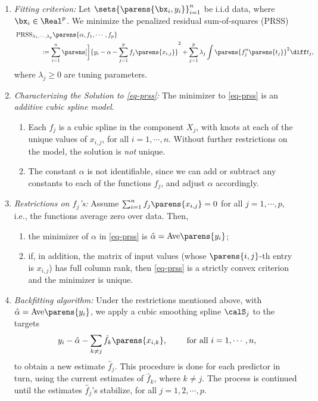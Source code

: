 \documentclass[12pt]{article}
\begin{document}
\begin{enumerate}[label=\textbf{\arabic*.}]
\begin{enumerate}
		\item \textit{Fitting criterion:} Let $\sets{\parens{\bx_i, y_i}}_{i=1}^n$ be i.i.d data, where $\bx_i \in \Real^p$. We minimize the penalized residual sum-of-squares (PRSS)
		\begin{align}\label{eq-prss}
			& \,\mathrm{PRSS}_{\lambda_1, \cdots, \lambda_p} \parens{\alpha, f_1, \cdots, f_p} \nonumber \\ 
			& \qquad \qquad := \sum_{i=1}^n \parens[\bigg]{y_i - \alpha - \sum_{j=1}^p f_j \parens{x_{i, j}}}^2 + \sum_{j=1}^p \lambda_j \int \parens{f''_j \parens{t_j}}^2 \diff t_j, 
		\end{align}
		where $\lambda_j \ge 0$ are tuning parameters. 
		
		\item \textit{Characterizing the Solution to \eqref{eq-prss}:} The minimizer to \eqref{eq-prss} is an \emph{additive cubic spline model}. 
		\begin{enumerate}
			\item Each $f_j$ is a cubic spline in the component $X_j$, with knots at each of the unique values of $x_{i,j}$, for all $i = 1, \cdots, n$. Without further restrictions on the model, the solution is \emph{not} unique. 
			\item The constant $\alpha$ is not identifiable, since we can add or subtract any constants to each of the functions $f_j$, and adjust $\alpha$ accordingly. 
		\end{enumerate}
		
		\item \textit{Restrictions on $f_j$'s:} Assume $\sum_{i=1}^n f_j \parens{x_{i,j}} = 0$ for all $j = 1, \cdots, p$, i.e., the functions average zero over data. Then, 
		\begin{enumerate}
			\item the minimizer of $\alpha$ in \eqref{eq-prss} is $\hat{\alpha} = \mathrm{Ave} \parens{y_i}$; 
			\item if, in addition, the matrix of input values (whose $\parens{i,j}$-th entry is $x_{i,j}$) has full column rank, then \eqref{eq-prss} is a strictly convex criterion and the minimizer is unique. 
		\end{enumerate}
		
		\item \textit{Backfitting algorithm:} Under the restrictions mentioned above, with $\hat{\alpha} = \mathrm{Ave} \parens{y_i}$, we apply a cubic smoothing spline $\calS_j$ to the targets 
		\begin{align*}
			y_i - \hat{\alpha} - \sum_{k \neq j} \hat{f}_{k} \parens{x_{i,k}}, \qquad \text{ for all } i = 1, \cdots, n, 
		\end{align*}
		to obtain a new estimate $\hat{f}_j$. This procedure is done for each predictor in turn, using the current estimates of $\hat{f}_k$, where $k \neq j$. The process is continued until the estimates $\hat{f}_j$'s stabilize, for all $j = 1, 2, \cdots, p$. 
		

\end{enumerate}
\end{enumerate}
\end{document}
